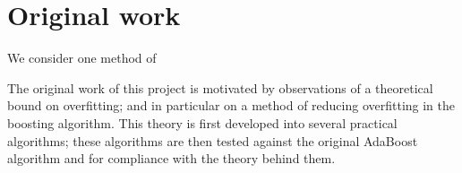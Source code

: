 \section{Original work}

We consider one method of 

The original work of this project is motivated by observations of a
theoretical bound on overfitting; and in particular on a method of
reducing overfitting in the boosting algorithm.  This theory is first
developed into several practical algorithms; these algorithms are then
tested against the original AdaBoost algorithm and for compliance with
the theory behind them.





